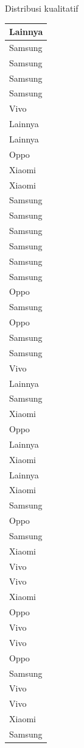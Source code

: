 \documentclass[
  ignorenonframetext,
]{beamer}
\begin{document}
\begin{frame}[s]{Distribusi kualitatif}
\begin{table}
\begin{tabular}[t]{l}
\hline
Lainnya\\
\hline
Samsung\\
\hline
Samsung\\
\hline
Samsung\\
\hline
Samsung\\
\hline
Vivo\\
\hline
Lainnya\\
\hline
Lainnya\\
\hline
Oppo\\
\hline
Xiaomi\\
\hline
Xiaomi\\
\hline
Samsung\\
\hline
Samsung\\
\hline
Samsung\\
\hline
Samsung\\
\hline
Samsung\\
\hline
Samsung\\
\hline
Oppo\\
\hline
Samsung\\
\hline
Oppo\\
\hline
Samsung\\
\hline
Samsung\\
\hline
Vivo\\
\hline
Lainnya\\
\hline
Samsung\\
\hline
Xiaomi\\
\hline
Oppo\\
\hline
Lainnya\\
\hline
Xiaomi\\
\hline
Lainnya\\
\hline
Xiaomi\\
\hline
Samsung\\
\hline
Oppo\\
\hline
Samsung\\
\hline
Xiaomi\\
\hline
Vivo\\
\hline
Vivo\\
\hline
Xiaomi\\
\hline
Oppo\\
\hline
Vivo\\
\hline
Vivo\\
\hline
Oppo\\
\hline
Samsung\\
\hline
Vivo\\
\hline
Vivo\\
\hline
Xiaomi\\
\hline
Samsung\\

\end{tabular}
\end{table}
\end{frame}
\end{document}
